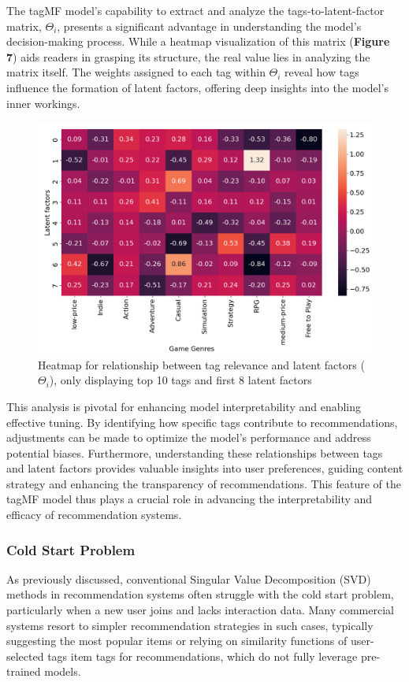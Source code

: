 \documentclass[sigplan,screen]{acmart}
\begin{document}
The tagMF model's capability to extract and analyze the tags-to-latent-factor matrix, \(\Theta_i\), presents a significant advantage in understanding the model's decision-making process. While a heatmap visualization of this matrix (\textbf{Figure 7}) aids readers in grasping its structure, the real value lies in analyzing the matrix itself. The weights assigned to each tag within \(\Theta_i\) reveal how tags influence the formation of latent factors, offering deep insights into the model’s inner workings.

\begin{figure}[h]
  \centering
  \includegraphics[width=\linewidth]{relationship.png}
  \caption{Heatmap for relationship between tag relevance and latent factors ($\Theta_i$), only displaying top 10 tags and first 8 latent factors}
\end{figure}

This analysis is pivotal for enhancing model interpretability and enabling effective tuning. By identifying how specific tags contribute to recommendations, adjustments can be made to optimize the model’s performance and address potential biases. Furthermore, understanding these relationships between tags and latent factors provides valuable insights into user preferences, guiding content strategy and enhancing the transparency of recommendations. This feature of the tagMF model thus plays a crucial role in advancing the interpretability and efficacy of recommendation systems.

\subsubsection{Cold Start Problem}
As previously discussed, conventional Singular Value Decomposition (SVD) methods in recommendation systems often struggle with the cold start problem, particularly when a new user joins and lacks interaction data. Many commercial systems resort to simpler recommendation strategies in such cases, typically suggesting the most popular items\cite{KonstanRiedl12} or relying on similarity functions of user-selected tags item tags for recommendations, which do not fully leverage pre-trained models.
\end{document}
